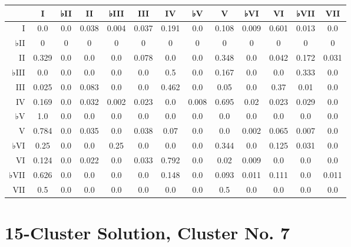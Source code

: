 \begin{table}[htbp]
\begin{minipage}{\linewidth}
\setlength{\tymax}{0.5\linewidth}
\centering
\small
\begin{tabulary}{\textwidth}{@{}RCCCCCCCCCCCC@{}} \toprule
&I&♭II&II&♭III&III&IV&♭V&V&♭VI&VI&♭VII&VII\\
\midrule
I&0.0&0.0&0.038&0.004&0.037&0.191&0.0&0.108&0.009&0.601&0.013&0.0\\
♭II&0&0&0&0&0&0&0&0&0&0&0&0\\
II&0.329&0.0&0.0&0.0&0.078&0.0&0.0&0.348&0.0&0.042&0.172&0.031\\
♭III&0.0&0.0&0.0&0.0&0.0&0.5&0.0&0.167&0.0&0.0&0.333&0.0\\
III&0.025&0.0&0.083&0.0&0.0&0.462&0.0&0.05&0.0&0.37&0.01&0.0\\
IV&0.169&0.0&0.032&0.002&0.023&0.0&0.008&0.695&0.02&0.023&0.029&0.0\\
♭V&1.0&0.0&0.0&0.0&0.0&0.0&0.0&0.0&0.0&0.0&0.0&0.0\\
V&0.784&0.0&0.035&0.0&0.038&0.07&0.0&0.0&0.002&0.065&0.007&0.0\\
♭VI&0.25&0.0&0.0&0.25&0.0&0.0&0.0&0.344&0.0&0.125&0.031&0.0\\
VI&0.124&0.0&0.022&0.0&0.033&0.792&0.0&0.02&0.009&0.0&0.0&0.0\\
♭VII&0.626&0.0&0.0&0.0&0.0&0.148&0.0&0.093&0.011&0.111&0.0&0.011\\
VII&0.5&0.0&0.0&0.0&0.0&0.0&0.0&0.5&0.0&0.0&0.0&0.0\\

\bottomrule

\end{tabulary}
\end{minipage}
\end{table}

\section{15-Cluster Solution, Cluster No. 7}
\label{15-clustersolutionclusterno.7}

